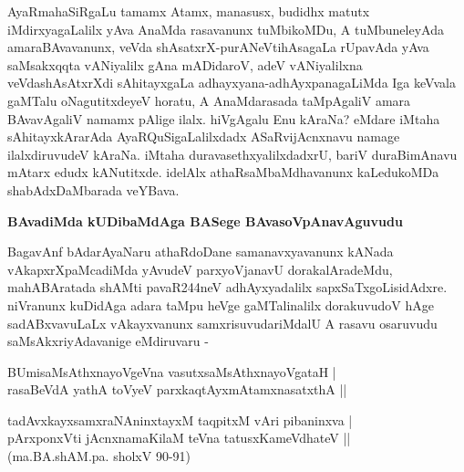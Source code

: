 AyaRmahaSiRgaLu tamamx Atamx, manasusx, budidhx matutx iMdirxyagaLalilx yAva AnaMda rasa\-vanunx tuMbikoMDu, A tuMbuneleyAda amaraBAvavanunx, veVda shAsatxrX-purANeVtihAsagaLa rUpa\-vAda yAva saMsakxqqta vANiyalilx gAna mADi\-daroV, adeV vANiyalilxna veVdashAsAtxrXdi sAhitayxgaLa adhayx\-yana-\-adhAyxpanagaLiMda Iga keVvala gaMTalu oNagutitxdeyeV horatu, A AnaMdarasada taMpA\-galiV amara BAvavAgaliV namamx pAlige ilalx. hiVgAgalu Enu kAraNa? eMdare iMtaha sAhitayx\-kAra\-rAda AyaR\-QuSi\-gaLa\-lilxdadx ASaRvijAcnxnavu namage ilalxdiruvudeV kAraNa. iMtaha duravasethxyalilxdadxrU, bariV duraBi\-mAnavu mAtarx edudx kANutitxde. idelAlx athaRsaMbaMdhavanunx kaLedukoMDa shabAdxDaMbarada veYBava.

{\bigskip
\noindent
{\large\bf BAvadiMda kUDibaMdAga BASege BAvasoVpAnavAguvudu}}\label{page26}
\medskip

\noindent
BagavAnf bAdarAyaNaru athaRdoDane samanavxyavanunx kANada vAkapxrXpaMcadiMda yAvudeV parx\-yoVjanavU dorakalAradeMdu, mahABAratada shAMti pavaR\break 244neV adhAyxyadalilx sapxSaTx\-goLisi\-dAdxre. niVranunx kuDidAga adara taMpu heVge gaMTalinalilx dorakuvudoV hAge sadABxvavuLaLx vAkayxvanunx samxrisu\-vuda\-riMdalU A rasavu osaruvudu saMsAkxriyAdavanige eMdiruvaru -

\medskip
\begin{shloka}
BUmisaMsAthxnayoVgeVna vasutxsaMsAthxnayoVgataH |\\\label{26}
rasaBeVdA yathA toVyeV parxkaqtAyxmAtamxnasatxthA ||\\
\end{shloka}

\begin{shloka}
tadAvxkayxsamxraNAninxtayxM taqpitxM vAri pibaninxva |\\
pArxponxVti jAcnxnamaKilaM teVna tatusxKameVdhateV ||\\
\hfill(ma.BA.shAM.pa. sholxV 90-91)
\end{shloka}

